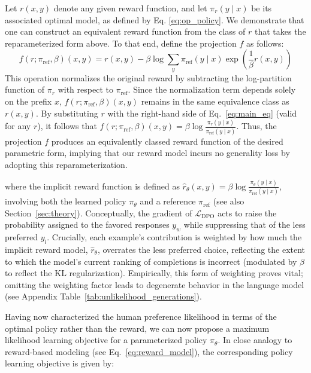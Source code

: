 \begin{sproof}
    Let $r(x, y)$ denote any given reward function, and let $\pi_r(y \mid x)$ be its associated optimal model, as defined by Eq. \ref{eq:op_policy}. We demonstrate that one can construct an equivalent reward function from the class of $r$ that takes the reparameterized form above. To that end, define the projection $f$ as follows:
\begin{equation}
    f(r; \pi_\text{ref}, \beta)(x, y) = r(x, y) - \beta\log\sum_{y}\pi_\text{ref}(y\mid x)\exp\left(\frac{1}{\beta}r(x, y)\right)
\end{equation}
This operation normalizes the original reward by subtracting the log-partition function of $\pi_r$ with respect to $\pi_\text{ref}$. Since the normalization term depends solely on the prefix $x$, $f(r; \pi_\text{ref}, \beta)(x, y)$ remains in the same equivalence class as $r(x, y)$. By substituting $r$ with the right-hand side of Eq.~\ref{eq:main_eq} (valid for any $r$), it follows that $f(r; \pi_\text{ref}, \beta)(x, y) = \beta \log \frac{\pi_r(y\mid x)}{\pi_\text{ref}(y\mid x)}$. Thus, the projection $f$ produces an equivalently classed reward function of the desired parametric form, implying that our reward model incurs no generality loss by adopting this reparameterization.
\end{sproof}

where the implicit reward function is defined as $\hat{r}_\theta(x, y) = \beta \log \frac{\pi_\theta(y \mid x)}{\pi_\text{ref}(y \mid x)}$, involving both the learned policy $\pi_\theta$ and a reference $\pi_\text{ref}$ (see also Section~\ref{sec:theory}). Conceptually, the gradient of $\mathcal{L}_\text{DPO}$ acts to raise the probability assigned to the favored responses $y_w$ while suppressing that of the less preferred $y_l$. Crucially, each example’s contribution is weighted by how much the implicit reward model, $\hat{r}_\theta$, overrates the less preferred choice, reflecting the extent to which the model’s current ranking of completions is incorrect (modulated by $\beta$ to reflect the KL regularization). Empirically, this form of weighting proves vital; omitting the weighting factor leads to degenerate behavior in the language model (see Appendix Table~\ref{tab:unlikelihood_generations}).

Having now characterized the human preference likelihood in terms of the optimal policy rather than the reward, we can now propose a maximum likelihood learning objective for a parameterized policy $\pi_\theta$. In close analogy to reward-based modeling (see Eq.~\ref{eq:reward_model}), the corresponding policy learning objective is given by:

